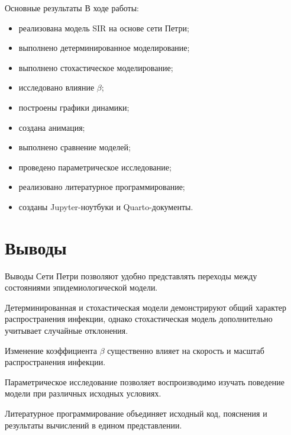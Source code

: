 \documentclass[
  ignorenonframetext,
  aspectratio=169,
  russian,
]{beamer}
\providecommand{\tightlist}{%
  \setlength{\itemsep}{0pt}\setlength{\parskip}{0pt}}
\begin{document}
\begin{frame}{Основные результаты}
В ходе работы:

\begin{itemize}[<+->]
\tightlist
\item
  реализована модель SIR на основе сети Петри;
\item
  выполнено детерминированное моделирование;
\item
  выполнено стохастическое моделирование;
\item
  исследовано влияние \(\beta\);
\item
  построены графики динамики;
\item
  создана анимация;
\item
  выполнено сравнение моделей;
\item
  проведено параметрическое исследование;
\item
  реализовано литературное программирование;
\item
  созданы Jupyter-ноутбуки и Quarto-документы.
\end{itemize}
\end{frame}

\section{Выводы}\label{ux432ux44bux432ux43eux434ux44b}

\begin{frame}{Выводы}
Сети Петри позволяют удобно представлять переходы между состояниями
эпидемиологической модели.

Детерминированная и стохастическая модели демонстрируют общий характер
распространения инфекции, однако стохастическая модель дополнительно
учитывает случайные отклонения.

Изменение коэффициента \(\beta\) существенно влияет на скорость и
масштаб распространения инфекции.

Параметрическое исследование позволяет воспроизводимо изучать поведение
модели при различных исходных условиях.

Литературное программирование объединяет исходный код, пояснения и
результаты вычислений в едином представлении.
\end{frame}
\end{document}
